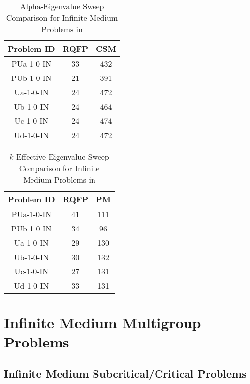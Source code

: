 \begin{table}[]
    \centering
    \caption{Alpha-Eigenvalue Sweep Comparison for Infinite Medium Problems in \cite{sood2003analytical}}
    \label{table:alph}
    \centering
    \begin{tabular}{*3c}
        Problem ID & RQFP & CSM \\    
        \midrule
        PUa-1-0-IN & 33 & 432 \\
        PUb-1-0-IN & 21 & 391   \\
	Ua-1-0-IN & 24 & 472\\
	Ub-1-0-IN & 24 & 464 \\
	Uc-1-0-IN & 24 & 474 \\
	Ud-1-0-IN & 24 & 472\\
        \bottomrule
    \end{tabular}
\end{table}

\begin{table}[]
    \centering
    \caption{$k$-Effective Eigenvalue Sweep Comparison for Infinite Medium Problems in \cite{sood2003analytical}}
\label{table:k}
    \centering
    \begin{tabular}{*3c}
        Problem ID & RQFP & PM \\    
        \midrule
        PUa-1-0-IN & 41 & 111 \\
        PUb-1-0-IN & 34 & 96   \\
	Ua-1-0-IN & 29 & 130\\
	Ub-1-0-IN & 30 & 132 \\
	Uc-1-0-IN & 27 & 131 \\
	Ud-1-0-IN & 33 & 131\\
        \bottomrule
    \end{tabular}
\end{table}

\section{Infinite Medium Multigroup Problems}

\subsection{Infinite Medium Subcritical/Critical Problems}

